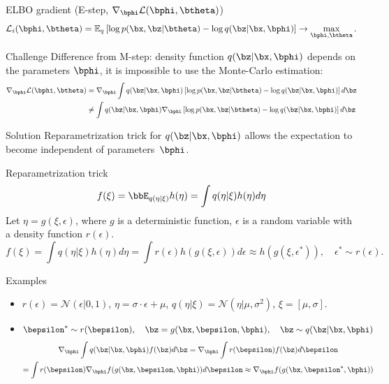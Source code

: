 \begin{frame}{ELBO gradient (E-step, $\nabla_{\bphi} \mathcal{L}(\bphi, \btheta)$)}
	\vspace{-0.3cm}
	\[
		 \mathcal{L}_i (\bphi, \btheta)  = \mathbb{E}_{q} \left[\log p(\bx, \bz | \btheta) - \log q(\bz| \bx, \bphi) \right] \rightarrow \max_{\bphi, \btheta}.
	\]	
	\vspace{-0.3cm}
	\begin{block}{Challenge}
	Difference from M-step: density function $q(\bz| \bx, \bphi)$ depends on the parameters $\bphi$, it is impossible to use the Monte-Carlo estimation:
	\begin{align*}
		\nabla_{\bphi} \mathcal{L} (\bphi, \btheta) &= \nabla_{\bphi} \int q(\bz | \bx, \bphi) \left[\log p(\bx, \bz | \btheta) - \log q(\bz| \bx, \bphi) \right] d \bz \\
		& \neq  \int q(\bz | \bx, \bphi) \nabla_{\bphi} \left[\log p(\bx, \bz | \btheta) - \log q(\bz| \bx, \bphi) \right] d \bz \\
	\end{align*}
	\end{block}
	\vspace{-0.8cm}
	\begin{block}{Solution}
		Reparametrization trick for $q(\bz | \bx, \bphi)$ allows the expectation to become independent of parameters~$\bphi$.
	\end{block}
\end{frame}
\begin{frame}{Reparametrization trick}
		\vspace{-0.3cm}
		\[
		f(\xi) = \bbE_{q(\eta | \xi)} h(\eta) = \int q(\eta|\xi) h(\eta) d\eta
		\]
		Let $\eta = g(\xi, \epsilon)$, where $g$ is a deterministic function, $\epsilon$ is a random variable with a density function $r(\epsilon)$.
		{\small
		\[
			f(\xi) = \int q(\eta|\xi) h(\eta) d\eta = \int r(\epsilon) h(g(\xi, \epsilon)) d \epsilon \approx h(g(\xi, \epsilon^*)), \quad \epsilon^* \sim r(\epsilon).
		\]}
	\begin{block}{Examples} 
		\begin{itemize}
		\item $r(\epsilon) = \mathcal{N}(\epsilon|0, 1)$, $\eta = \sigma \cdot \epsilon + \mu$, $q(\eta|\xi) = \mathcal{N}(\eta| \mu, \sigma^2)$, $\xi = [\mu, \sigma]$.

		\item $\bepsilon^* \sim r(\bepsilon), \quad \bz = g(\bx, \bepsilon, \bphi), \quad \bz \sim q(\bz | \bx, \bphi)$
		\begin{multline*}
			\nabla_{\bphi}\int q(\bz|\bx, \bphi) f(\bz) d\bz = \nabla_{\bphi}\int r(\bepsilon)  f(\bz) d\bepsilon \\ = \int r(\bepsilon) \nabla_{\bphi} f(g(\bx, \bepsilon, \bphi)) d\bepsilon \approx \nabla_{\bphi} f(g(\bx, \bepsilon^*, \bphi))
		\end{multline*}
		\end{itemize}
	\end{block}
\end{frame}
